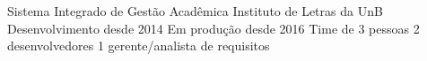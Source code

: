 Sistema Integrado de Gestão Acadêmica
Instituto de Letras da UnB
Desenvolvimento desde 2014
Em produção desde 2016
Time de 3 pessoas
2 desenvolvedores
1 gerente/analista de requisitos

